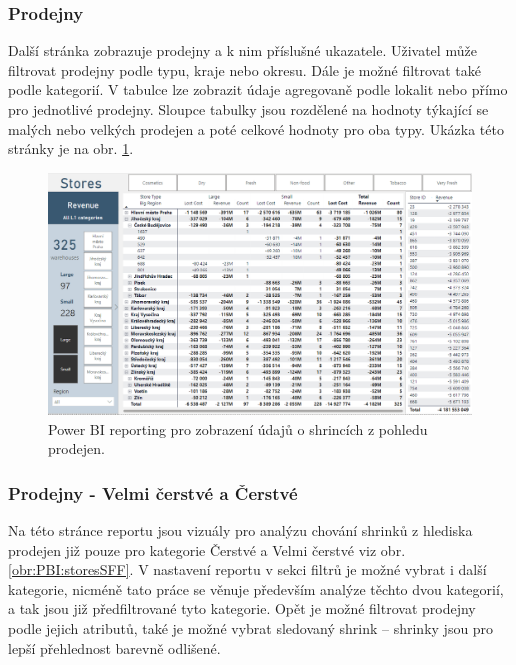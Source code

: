 \subsubsection*{Prodejny}

Další stránka zobrazuje prodejny a k nim příslušné ukazatele. Uživatel může filtrovat prodejny podle typu, kraje nebo okresu. Dále je možné filtrovat také podle kategorií. V tabulce lze zobrazit údaje agregovaně podle lokalit nebo přímo pro jednotlivé prodejny. Sloupce tabulky jsou rozdělené na hodnoty týkající se malých nebo velkých prodejen a poté celkové hodnoty pro oba typy. Ukázka této stránky je na obr. \ref*{obr:PBI:stores}.

\begin{figure}[hbtp!]
    \centering
    \captionsetup{justification=centering}
    \includegraphics[width=\textwidth]{obrazky/PBI/stores.png}
    \caption{Power BI reporting pro zobrazení údajů o shrincích z pohledu prodejen.}
    \label{obr:PBI:stores}
\end{figure}

\subsubsection*{Prodejny - Velmi čerstvé a Čerstvé}

Na této stránce reportu jsou vizuály pro analýzu chování shrinků z hlediska prodejen již pouze pro kategorie Čerstvé a Velmi čerstvé viz obr. \ref*{obr:PBI:storesSFF}. V nastavení reportu v sekci filtrů je možné vybrat i další kategorie, nicméně tato práce se věnuje především analýze těchto dvou kategorií, a tak jsou již předfiltrované tyto kategorie. Opět je možné filtrovat prodejny podle jejich atributů, také je možné vybrat sledovaný shrink -- shrinky jsou pro lepší přehlednost barevně odlišené.

